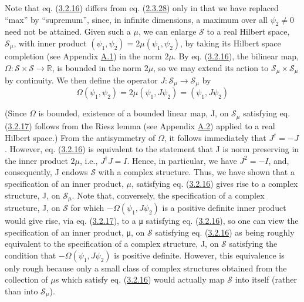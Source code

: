 \documentclass[11pt,a4paper]{article}
\begin{document}
Note that eq. (\hyperref[eq:3.2.16]{3.2.16}) differs from eq. (\hyperref[eq:2.3.28]{2.3.28}) only in that we have replaced ``max'' by ``supremum'', since, in infinite dimensions, a maximum over all \(\psi_2 \neq 0\) need not be attained. Given such a \(\mu\), we can enlarge \(\mathcal S\) to a real Hilbert space, \(\mathcal S_\mu\), with inner product \((\psi_1,\psi_2)=2\mu(\psi_1,\psi_2)\), by taking its Hilbert space completion (see Appendix \hyperlink{sec:A.1}{A.1}) in the norm \(2\mu\). By eq. (\hyperref[eq:3.2.16]{3.2.16}), the bilinear map, \(\Omega: \mathcal S \times \mathcal S \to \mathbb R\), is bounded in the norm \(2\mu\), so we may extend its action to \(\mathcal S_\mu \times \mathcal S_\mu\) by continuity. We then define the operator \(J: \mathcal S_\mu \to \mathcal S_\mu\) by
\begin{equation*}
\Omega(\psi_1, \psi_2) = 2\mu(\psi_1, J\psi_2) = (\psi_1, J\psi_2) \tag{3.2.17}\label{eq:3.2.17}
\end{equation*}

(Since \(\Omega\) is bounded, existence of a bounded linear map, J, on \(\mathcal{S}_{\mu}\) satisfying eq. (\hyperref[eq:3.2.17]{3.2.17}) follows from the Riesz lemma (see Appendix \hyperlink{sec:A.2}{A.2}) applied to a real Hilbert space.) From the antisymmetry of \(\Omega\), it follows immediately that \(J^{\dagger} = -J\). However, eq. (\hyperref[eq:3.2.16]{3.2.16}) is equivalent to the statement that J is norm preserving in the inner product \(2\mu\), i.e., \(J^{\dagger}J = I\). Hence, in particular, we have \(J^2 = -I\), and, consequently, J endows \(\mathcal{S}\) with a complex structure. Thus, we have shown that a specification of an inner product, \(\mu\), satisfying eq. (\hyperref[eq:3.2.16]{3.2.16}) gives rise to a complex structure, J, on \(\mathcal{S}_{\mu}\). Note that, conversely, the specification of a complex structure, J, on \(\mathcal{S}\) for which \(-\Omega(\psi_1,J\psi_2)\) is a positive definite inner product would give rise, via eq. (\hyperref[eq:3.2.17]{3.2.17}), to a μ satisfying eq. (\hyperref[eq:3.2.16]{3.2.16}), so one can view the specification of an inner product, μ, on \(\mathcal{S}\) satisfying eq. (\hyperref[eq:3.2.16]{3.2.16}) as being roughly equivalent to the specification of a complex structure, J, on \(\mathcal{S}\) satisfying the condition that \(-\Omega(\psi_1,J\psi_2)\) is positive definite. However, this equivalence is only rough because only a small class of complex structures obtained from the collection of \(\mu\)s which satisfy eq. \hypertarget{source-55}{} (\hyperref[eq:3.2.16]{3.2.16}) would actually map \(\mathcal{S}\) into itself (rather than into \(\mathcal{S}_\mu\)).
\end{document}
